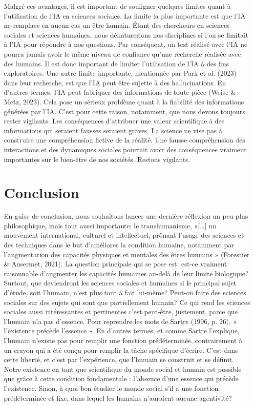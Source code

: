 \documentclass[
  letterpaper,
  DIV=11,
  numbers=noendperiod]{scrreprt}
\begin{document}
Malgré ces avantages, il est important de souligner quelques limites
quant à l'utilisation de l'IA en sciences sociales. La limite la plus
importante est que l'IA ne remplace en aucun cas un être humain. Étant
des chercheurs en sciences sociales et sciences humaines, nous
dénaturerions nos disciplines si l'on se limitait à l'IA pour répondre à
nos questions. Par conséquent, un test réalisé avec l'IA ne pourra
jamais avoir le même niveau de confiance qu'une recherche réalisée avec
des humains. Il est donc important de limiter l'utilisation de l'IA à
des fins exploratoires. Une autre limite importante, mentionnée par Park
et al. (2023) dans leur recherche, est que l'IA peut être sujette à des
hallucinations. En d'autres termes, l'IA peut fabriquer des informations
de toute pièce (Weise \& Metz, 2023). Cela pose un sérieux problème
quant à la fiabilité des informations générées par l'IA. C'est pour
cette raison, notamment, que nous devons toujours rester vigilants. Les
conséquences d'attribuer une valeur scientifique à des informations qui
seraient fausses seraient graves. La science ne vise pas à construire
une compréhension fictive de la réalité. Une fausse compréhension des
interactions et des dynamiques sociales pourrait avoir des conséquences
vraiment importantes sur le bien-être de nos sociétés. Restons
vigilants.

\hypertarget{conclusion-2}{%
\section{Conclusion}\label{conclusion-2}}

En guise de conclusion, nous souhaitons lancer une dernière réflexion un
peu plus philosophique, mais tout aussi importante: le transhumanisme,
«{[}\ldots{]} un mouvement international, culturel et intellectuel,
prônant l'usage des sciences et des techniques dans le but d'améliorer
la condition humaine, notamment par l'augmentation des capacités
physiques et mentales des êtres humains » (Forestier \& Ansermet, 2021).
La question principale qui se pose est: est-ce vraiment raisonnable
d'augmenter les capacités humaines au-delà de leur limite biologique?
Surtout, que deviendront les sciences sociales et humaines si le
principal sujet d'étude, soit l'humain, n'est plus tout à fait lui-même?
Peut-on faire des sciences sociales sur des sujets qui sont que
partiellement humain? Ce qui rend les sciences sociales aussi
intéressantes et pertinentes c'est peut-être, justement, parce que
l'humain n'a pas d'essence. Pour reprendre les mots de Sartre (1996, p.
26), « l'existence précède l'essence ». En d'autres termes, et comme
Sartre l'explique, l'humain n'existe pas pour remplir une fonction
prédéterminée, contrairement à un crayon qui a été conçu pour remplir la
tâche spécifique d'écrire. C'est dans cette liberté, et c'est par
l'expérience, que l'humain se construit et se définit. Notre existence
en tant que scientifique du monde social et humain est possible que
grâce à cette condition fondamentale : l'absence d'une essence qui
précède l'existence. Sinon, à quoi bon étudier le monde social s'il a
une fonction prédéterminée et fixe, dans lequel les humains n'auraient
aucune agentivité?
\end{document}
